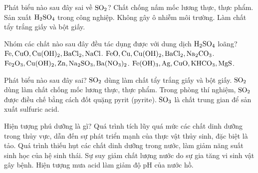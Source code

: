 \documentclass[12pt,a4paper]{article}
\begin{document}
\begin{ex}
Phát biểu nào sau đây sai về $\ce{SO2}$?
\choice
{Chất chống nấm mốc lương thực, thực phẩm.}
{Sản xuất $\ce{H2SO4}$ trong công nghiệp.}
{\True Không gây ô nhiễm môi trường.}
{Làm chất tẩy trắng giấy và bột giấy.}
\end{ex}

\begin{ex}
Nhóm các chất nào sau đây đều tác dụng được với dung dịch $\ce{H2SO4}$ loãng?
\choice
{$\ce{Fe, CuO, Cu(OH)2, BaCl2, NaCl}$.}
{$\ce{FeO, Cu, Cu(OH)2, BaCl2, Na2CO3}$.}
{\True $\ce{Fe2O3, Cu(OH)2, Zn, Na2SO3, Ba(NO3)2}$.}
{$\ce{Fe(OH)3, Ag, CuO, KHCO3, MgS}$.}
\end{ex}

\begin{ex}
Phát biểu nào sau đây sai?
\choice
{$\ce{SO2}$ dùng làm chất tẩy trắng giấy và bột giấy.}
{$\ce{SO2}$ dùng làm chất chống mốc lương thực, thực phẩm.}
{\True Trong phòng thí nghiệm, $\ce{SO2}$ được điều chế bằng cách đốt quặng pyrit (pyrite).}
{$\ce{SO3}$ là chất trung gian để sản xuất sulfuric acid.}
\end{ex}

\begin{ex}
Hiện tượng phú dưỡng là gì?
\choice
{\True Quá trình tích lũy quá mức các chất dinh dưỡng trong thủy vực, dẫn đến sự phát triển mạnh của thực vật thủy sinh, đặc biệt là tảo.}
{Quá trình thiếu hụt các chất dinh dưỡng trong nước, làm giảm năng suất sinh học của hệ sinh thái.}
{Sự suy giảm chất lượng nước do sự gia tăng vi sinh vật gây bệnh.}
{Hiện tượng mưa acid làm giảm độ pH của nước hồ.}
\end{ex}
\end{document}

